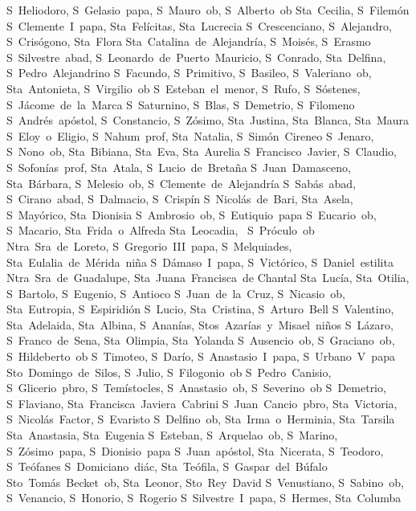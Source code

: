 S~Heliodoro, S~Gelasio~papa, S~Mauro~ob, S~Alberto~ob
Sta~Cecilia, S~Filem\'on
S~Clemente~I~papa, Sta~Fel\'icitas, Sta~Lucrecia
S~Crescenciano, S~Alejandro, S~Cris\'ogono, Sta~Flora
Sta~Catalina~de~Alejandr\'ia, S~Mois\'es, S~Erasmo
S~Silvestre~abad, S~Leonardo~de~Puerto~Mauricio, S~Conrado, Sta~Delfina, S~Pedro~Alejandrino
S~Facundo, S~Primitivo, S~Basileo, S~Valeriano~ob, Sta~Antonieta, S~Virgilio~ob
S~Esteban~el~menor, S~Rufo, S~S\'ostenes, S~J\'acome~de~la~Marca
S~Saturnino, S~Blas, S~Demetrio, S~Filomeno
S~Andr\'es~ap\'ostol, S~Constancio, S~Z\'osimo, Sta~Justina, Sta~Blanca, Sta~Maura
S~Eloy~o~Eligio, S~Nahum~prof, Sta~Natalia, S~Sim\'on~Cireneo
S~Jenaro, S~Nono~ob, Sta~Bibiana, Sta~Eva, Sta~Aurelia
S~Francisco~Javier, S~Claudio, S~Sofon\'ias~prof, Sta~Atala, S~Lucio~de~Breta\~na
S~Juan~Damasceno, Sta~B\'arbara, S~Melesio~ob, S~Clemente~de~Alejandr\'ia
S~Sab\'as~abad, S~Cirano~abad, S~Dalmacio, S~Crisp\'in
S~Nicol\'as~de~Bari, Sta~Asela, S~May\'orico, Sta~Dionisia
S~Ambrosio~ob, S~Eutiquio~papa
S~Eucario~ob, S~Macario, Sta~Frida~o~Alfreda
Sta~Leocadia, ~S~Pr\'oculo~ob
Ntra~Sra~de~Loreto, S~Gregorio~III~papa, S~Melquiades, Sta~Eulalia~de~M\'erida~ni\~na
S~D\'amaso~I~papa, S~Vict\'orico, S~Daniel~estilita
Ntra~Sra~de~Guadalupe, Sta~Juana~Francisca~de Chantal
Sta~Luc\'ia, Sta~Otilia, S~Bartolo, S~Eugenio, S~Antioco
S~Juan~de~la~Cruz, S~Nicasio~ob, Sta~Eutropia, S~Espiridi\'on
S~Lucio, Sta~Cristina, S~Arturo~Bell
S~Valentino, Sta~Adelaida, Sta~Albina, S~Anan\'ias, Stos~Azar\'ias~y~Misael~ni\~nos
S~L\'azaro, S~Franco~de~Sena, Sta~Olimpia, Sta~Yolanda
S~Ausencio~ob, S~Graciano~ob, S~Hildeberto~ob
S~Timoteo, S~Dar\'io, S~Anastasio~I~papa, S~Urbano~V~papa
Sto~Domingo~de~Silos, S~Julio, S~Filogonio~ob
S~Pedro~Canisio, S~Glicerio~pbro, S~Tem\'istocles, S~Anastasio~ob, S~Severino~ob
S~Demetrio, S~Flaviano, Sta~Francisca~Javiera~Cabrini
S~Juan~Cancio~pbro, Sta~Victoria, S~Nicol\'as~Factor, S~Evaristo
S~Delfino~ob, Sta~Irma~o~Herminia, Sta~Tarsila
Sta~Anastasia, Sta~Eugenia
S~Esteban, S~Arquelao~ob, S~Marino, S~Z\'osimo~papa, S~Dionisio~papa
S~Juan~ap\'ostol, Sta~Nicerata, S~Teodoro, S~Te\'ofanes
S~Domiciano~di\'ac, Sta~Te\'ofila, S~Gaspar~del~B\'ufalo
Sto~Tom\'as~Becket~ob, Sta~Leonor, Sto~Rey~David
S~Venustiano, S~Sabino~ob, S~Venancio, S~Honorio, S~Rogerio
S~Silvestre~I~papa, S~Hermes, Sta~Columba
